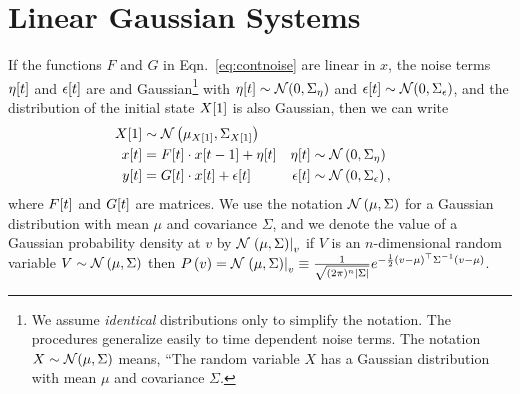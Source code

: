 \section{Linear Gaussian Systems}
\label{sec:LinearGaussian}

If the functions $F$ and $G$ in Eqn.~\eqref{eq:contnoise} are linear
in $x$, the noise terms ${\eta}{[t]}$ and ${\epsilon}{[t]}$ are \iid
and Gaussian\footnote{We assume \emph{identical} distributions only to
  simplify the notation.  The procedures generalize easily to time
  dependent noise terms.  The notation $X\sim{\mathcal{N}}(\mu,\Sigma)$
  means, ``The random variable $X$ has a Gaussian distribution with
  mean $\mu$ and covariance $\Sigma$.} with ${\eta}{[t]} \sim
{\mathcal{N}}(0,\Sigma_\eta)$ and ${\epsilon}{[t]} \sim
{\mathcal{N}}(0,\Sigma_\epsilon)$, and the distribution of the initial state
${X}{[1]}$ is also Gaussian, then we can write
\begin{subequations}
  \label{eq:LinearG}
  \begin{align}
  {X}{[1]} & \sim {\mathcal{N}}\left(\mu_{{X}{[1]}},\Sigma_{{X}{[1]}}
  \right)\\
  {x}{[t]} &= {F}{[t]} \cdot {x}{[t-1]} + {\eta}{[t]} &
  {\eta}{[t]} &\sim {\mathcal{N}}\left( 0, \Sigma_\eta \right) \\
  {y}{[t]} &= {G}{[t]} \cdot {x}{[t]} + {\epsilon}{[t]} &
  {\epsilon}{[t]} &\sim {\mathcal{N}}\left( 0, \Sigma_\epsilon \right),
  \end{align}
\end{subequations}
where ${F}{[t]}$ and ${G}{[t]}$ are matrices.  We use the notation
${\mathcal{N}}\left( \mu, \Sigma \right)$ for a Gaussian distribution with
mean $\mu$ and covariance $\Sigma$, and we denote the value of a
Gaussian probability density at $v$ by ${\mathcal{N}}\left.\left(\mu,\Sigma\right)\right|_{v}$ \ie
if $V$ is an $n$-dimensional random variable $V \sim {\mathcal{N}}\left( \mu,
  \Sigma \right)$ then $ P\left(v \right) = {\mathcal{N}}\left.\left(\mu,\Sigma\right)\right|_{v}
\equiv \frac{1}{\sqrt{(2\pi)^n \left|\Sigma\right|}} e^{-\frac{1}{2}
  (v-\mu)^\top \Sigma^{-1} (v-\mu)}$.

